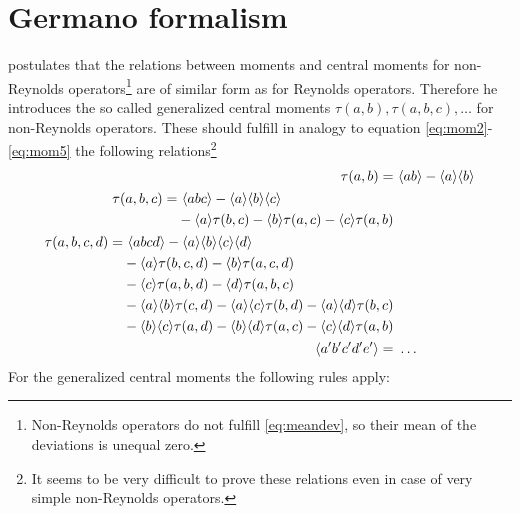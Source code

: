 \section{Germano formalism}
\citet{Germano1992} postulates that the relations between moments and central
moments for non-Reynolds operators\footnote{Non-Reynolds operators do not
fulfill \ref{eq:meandev}, so their mean of the deviations is unequal zero.} are
of similar form as for Reynolds operators.
Therefore he introduces the so called generalized central moments $\tau(a,b), 
\tau(a,b,c),\ldots$ for non-Reynolds operators. These should 
fulfill in analogy to equation \eqref{eq:mom2}-\eqref{eq:mom5} the following
relations\footnote{It seems to be very difficult to prove these relations even
in case of very simple non-Reynolds operators.}
\begin{align}
\tau(a,b)=&\ \langle a b \rangle-\langle a \rangle\langle b \rangle \label{eq:germ2}\\
\begin{split}
\tau(a,b,c)=&\ \langle a b c \rangle - \langle a \rangle\langle b \rangle\langle c \rangle\\
&-\langle a \rangle\tau(b, c) - \langle b \rangle\tau(a, c) - \langle c \rangle\tau(a, b)\label{eq:germ3}
\end{split}
\\
\begin{split}
\tau(a,b,c,d)=&\ \langle a b c d \rangle - \langle a \rangle\langle b \rangle\langle c \rangle\langle d \rangle\\
&-\langle a \rangle\tau(b, c, d) -\langle b \rangle\tau(a, c, d)\\
&-\langle c \rangle\tau(a, b, d) -\langle d \rangle\tau(a, b, c)\\
&-\langle a \rangle\langle b \rangle\tau(c, d)-\langle a \rangle\langle c \rangle\tau(b, d)-\langle a \rangle\langle d \rangle\tau(b, c)\\
&-\langle b \rangle\langle c \rangle\tau(a, d)-\langle b \rangle\langle d \rangle\tau(a, c)-\langle c \rangle\langle d \rangle\tau(a, b)
\end{split}
\\
\langle a' b' c' d' e' \rangle =&\ \ldots \label{eq:germ5}
\end{align}
For the generalized central moments the following rules apply:
